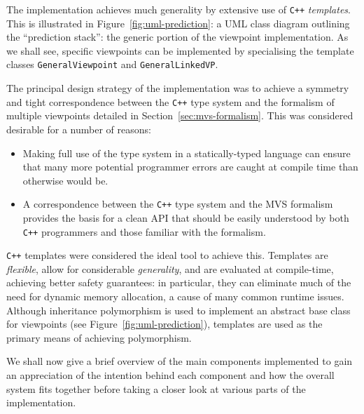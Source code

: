 \documentclass[12pt,a4paper,twoside,openright]{report}
\begin{document}
The implementation achieves much generality by extensive use of \texttt{C++}
\emph{templates}. This is illustrated in Figure~\ref{fig:uml-prediction}: a UML
class diagram outlining the ``prediction stack'': the generic portion of the
viewpoint implementation. As we shall see, specific viewpoints can be
implemented by specialising the template classes \texttt{GeneralViewpoint} and
\texttt{GeneralLinkedVP}. 

The principal design strategy of the implementation was to achieve a symmetry
and tight correspondence between the \texttt{C++} type system and the formalism
of multiple viewpoints detailed in Section~\ref{sec:mvs-formalism}. This was
considered desirable for a number of reasons:
\begin{itemize}
  \item Making full use of the type system in a statically-typed language can
    ensure that many more potential programmer errors are caught at compile time
    than otherwise would be.
  \item A correspondence between the \texttt{C++} type system and the MVS
    formalism provides the basis for a clean API that should be easily
    understood by both \texttt{C++} programmers and those familiar with the
    formalism.
\end{itemize}

\texttt{C++} templates were considered the ideal tool to achieve this. Templates
are \emph{flexible}, allow for considerable \emph{generality}, and are evaluated
at compile-time, achieving better safety guarantees: in particular, they can
eliminate much of the need for dynamic memory allocation, a cause of many common
runtime issues. Although inheritance polymorphism is used to implement an
abstract base class for viewpoints (see Figure~\ref{fig:uml-prediction}),
templates are used as the primary means of achieving polymorphism.

We shall now give a brief overview of the main components implemented to gain an
appreciation of the intention behind each component and how the overall system
fits together before taking a closer look at various parts of the
implementation.
\end{document}
